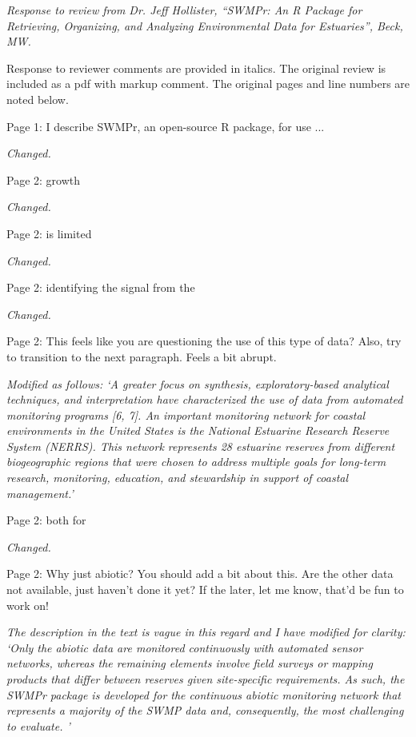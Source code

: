 \documentclass[letterpaper,12pt]{article}\usepackage[]{graphicx}\usepackage[]{color}
\begin{document}
\raggedright


{\it Response to review from Dr. Jeff Hollister, ``SWMPr: An R Package for Retrieving, Organizing, and Analyzing Environmental Data for Estuaries'', Beck, MW.}

Response to reviewer comments are provided in italics.  The original review is included as a pdf with markup comment. The original pages and line numbers are noted below.

Page 1: I describe SWMPr, an open-source R package, for use ...

{\it Changed.}

Page 2: growth

{\it Changed.}

Page 2: is limited

{\it Changed.}

Page 2: identifying the signal from the

{\it Changed.}

Page 2: This feels like you are questioning the use of this type of data? Also, try to transition to the next paragraph. Feels a bit abrupt.

{\it Modified as follows: `A greater focus on synthesis, exploratory-based analytical techniques, and interpretation have characterized the use of data from automated monitoring programs [6, 7].  An important monitoring network for coastal environments in the United States is the National Estuarine Research Reserve System (NERRS). This network represents 28 estuarine reserves from different biogeographic regions that were chosen to address multiple goals for long-term research, monitoring, education, and stewardship in support of coastal management.'}

Page 2: both for

{\it Changed.}

Page 2: Why just abiotic? You should add a bit about this. Are the other data not available, just haven't done it yet? If the later, let me know, that'd be fun to work on!

{\it The description in the text is vague in this regard and I have modified for clarity: `Only the abiotic data are monitored continuously with automated sensor networks, whereas the remaining elements involve field surveys or mapping products that differ between reserves given site-specific requirements.  As such, the SWMPr package is developed for the continuous abiotic monitoring network that represents a majority of the SWMP data and, consequently, the most challenging to evaluate.  '}
\end{document}
